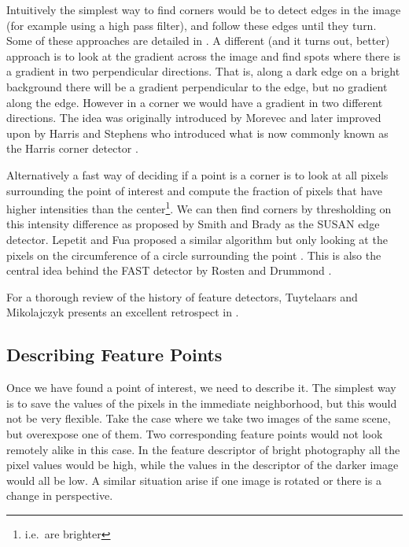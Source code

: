 Intuitively the simplest way to find corners would be to detect edges in 
the image (for example using a high pass filter), and follow these edges 
until they turn. Some of these approaches are detailed in 
\cite{university1978comparison}. A different (and it turns out, better) 
approach is to look at the gradient across the image and find spots 
where there is a gradient in two perpendicular directions.  That is, 
along a dark edge on a bright background there will be a gradient 
perpendicular to the edge, but no gradient along the edge.  However in a 
corner we would have a gradient in two different directions. The idea 
was originally introduced by Morevec \cite{hans1977towards} and later 
improved upon by Harris and Stephens who introduced what is now commonly 
known as the Harris corner detector \cite{harris1988combined}.

Alternatively a fast way of deciding if a point is a corner is to look 
at all pixels surrounding the point of interest and compute the fraction 
of pixels that have higher intensities than the center\footnote{i.e.\ 
are brighter}. We can then find corners by thresholding on this 
intensity difference as proposed by Smith and Brady 
\cite{smith1997susan} as the SUSAN edge detector. Lepetit and Fua 
proposed a similar algorithm but only looking at the pixels on the 
circumference of a circle surrounding the point 
\cite{lepetit2006keypoint}. This is also the central idea behind the 
FAST detector by Rosten and Drummond \cite{rosten2006machine}.

For a thorough review of the history of feature detectors, Tuytelaars 
and Mikolajczyk presents an excellent retrospect in 
\cite{tuytelaars2008local}.

\subsection{Describing Feature Points}

Once we have found a point of interest, we need to describe it. The 
simplest way is to save the values of the pixels in the immediate 
neighborhood, but this would not be very flexible. Take the case where 
we take two images of the same scene, but overexpose one of them. Two 
corresponding feature points would not look remotely alike in this case.
In the feature descriptor of bright photography all the pixel values 
would be high, while the values in the descriptor of the darker image 
would all be low. A similar situation arise if one image is rotated or 
there is a change in perspective.

